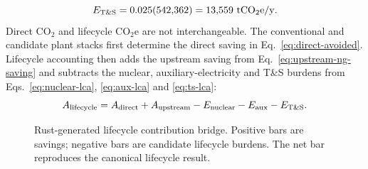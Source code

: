 \begin{equation}\label{eq:ts-lca}
E_{\rm T\&S}=0.025(542{,}362)=13{,}559~\mathrm{tCO_2e/y}.
\end{equation}
Direct CO$_2$ and lifecycle CO$_2$e are not interchangeable. The conventional and candidate plant stacks first determine the direct saving in Eq.~\ref{eq:direct-avoided}. Lifecycle accounting then adds the upstream saving from Eq.~\ref{eq:upstream-ng-saving} and subtracts the nuclear, auxiliary-electricity and T\&S burdens from Eqs.~\ref{eq:nuclear-lca}, \ref{eq:aux-lca} and \ref{eq:ts-lca}:
\begin{equation}\label{eq:lifecycle-avoided}
A_{\rm lifecycle}=A_{\rm direct}+A_{\rm upstream}-E_{\rm nuclear}-E_{\rm aux}-E_{\rm T\&S}.
\end{equation}

\begin{table}[htbp]\centering\scriptsize
\caption{Canonical lifecycle-emissions ledger generated by Rust. SAVED means less than the conventional baseline; ADDED means a new candidate burden.}
\label{tab:co2-ledger}
\end{table}

\begin{figure}[htbp]\centering

\caption{Rust-generated lifecycle contribution bridge.  Positive bars are savings; negative bars are candidate lifecycle burdens.  The net bar reproduces the canonical lifecycle result.}
\label{fig:co2-bridge}
\end{figure}


